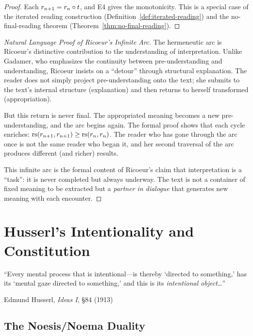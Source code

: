 \begin{proof}
Each $r_{n+1} = r_n \circ t$, and E4 gives the monotonicity.  This
is a special case of the iterated reading construction
(Definition~\ref{def:iterated-reading}) and the no-final-reading theorem
(Theorem~\ref{thm:no-final-reading}).
\end{proof}

\begin{proof}[Natural Language Proof of Ricoeur's Infinite Arc]
The hermeneutic arc is Ricoeur's distinctive contribution to the
understanding of interpretation.  Unlike Gadamer, who emphasizes the
continuity between pre-understanding and understanding, Ricoeur insists
on a ``detour'' through structural explanation.  The reader does not
simply project pre-understanding onto the text; she submits to the
text's internal structure (explanation) and then returns to herself
transformed (appropriation).

But this return is never final.  The appropriated meaning becomes a
new pre-understanding, and the arc begins again.  The formal proof
shows that each cycle enriches: $\mathrm{rs}(r_{n+1}, r_{n+1}) \geq \mathrm{rs}(r_n, r_n)$.
The reader who has gone through the arc once is not the same reader who
began it, and her second traversal of the arc produces different
(and richer) results.

This infinite arc is the formal content of Ricoeur's claim that
interpretation is a ``task'': it is never completed but always underway.
The text is not a container of fixed meaning to be extracted but a
\emph{partner in dialogue} that generates new meaning with each encounter.
\end{proof}




\chapter{Husserl's Intentionality and Constitution}
\label{ch:husserl}

\epigraph{``Every mental process that is intentional---is thereby `directed to
something,' has its `mental gaze directed to something,' and this is its
\textit{intentional object}\ldots ''}{Edmund Husserl, \textit{Ideas I}, \S84 (1913)}

\section{The Noesis/Noema Duality}


